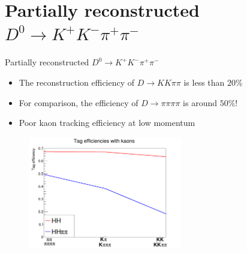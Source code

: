 \documentclass{beamer}
\begin{document}
\section{Partially reconstructed \texorpdfstring{$D^0\to K^+K^-\pi^+\pi^-$}{D02KKpipi}}
\begin{frame}{Partially reconstructed $D^0\to K^+K^-\pi^+\pi^-$}
  \begin{itemize}
    \item{The reconstruction efficiency of $D\to KK\pi\pi$ is less than $20\%$}
    \item{For comparison, the efficiency of $D\to\pi\pi\pi\pi$ is around $50\%$!}
    \item{Poor kaon tracking efficiency at low momentum}
  \end{itemize}
  \begin{figure}
    \includegraphics[width=0.6\textwidth]{Plots/KaonTrackingEfficiency.png}
  \end{figure}
\end{frame}
\end{document}
